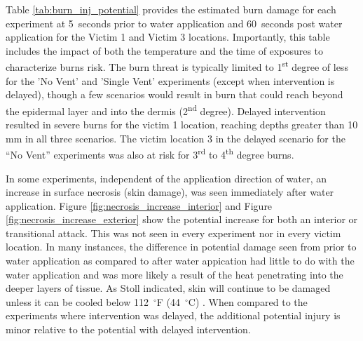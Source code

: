 \documentclass[12pt,oneside]{book}
\begin{document}
Table \ref{tab:burn_inj_potential} provides the estimated burn damage for each experiment at 5~seconds prior to water application and 60~seconds post water application for the Victim 1 and Victim 3 locations.  Importantly, this table includes the impact of both the temperature and the time of exposures to characterize burns risk.  The burn threat is typically limited to 1\textsuperscript{st} degree of less for the 'No Vent' and 'Single Vent' experiments (except when intervention is delayed), though a few scenarios would result in burn that could reach beyond the epidermal layer and into the dermis (2\textsuperscript{nd} degree). Delayed intervention resulted in severe burns for the victim 1 location, reaching depths greater than 10 mm in all three scenarios.  The victim location 3 in the delayed scenario for the ``No Vent'' experiments was also at risk for 3\textsuperscript{rd} to 4\textsuperscript{th} degree burns.
 

In some experiments, independent of the application direction of water, an increase in surface necrosis (skin damage), was seen immediately after water application. Figure \ref{fig:necrosis_increase_interior} and Figure \ref{fig:necrosis_increase_exterior} show the potential increase for both an interior or transitional attack. This was not seen in every experiment nor in every victim location. In many instances, the difference in potential damage seen from prior to water application as compared to after water appication had little to do with the water application and was more likely a result of the heat penetrating into the deeper layers of tissue.  As Stoll indicated, skin will continue to be damaged unless it can be cooled below 112~$^\circ$F (44~$^\circ$C) \cite{Pain_Thermal_Radiation}. When compared to the experiments where intervention was delayed, the additional potential injury is minor relative to the potential with delayed intervention. 
\end{document}
